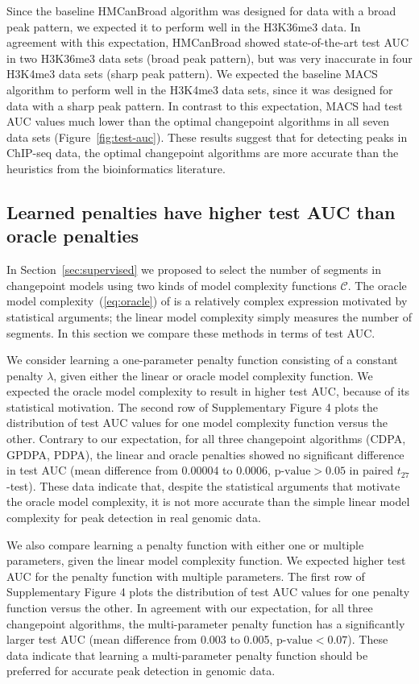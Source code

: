 \documentclass[twoside,11pt]{article}
\begin{document}
Since the baseline HMCanBroad algorithm was designed for data with a
broad peak pattern, we expected it to perform well in the H3K36me3
data. In agreement with this expectation, HMCanBroad showed
state-of-the-art test AUC in two H3K36me3 data sets (broad peak
pattern), but was very inaccurate in four H3K4me3 data sets (sharp
peak pattern). We expected the baseline MACS algorithm to perform well
in the H3K4me3 data sets, since it was designed for data with a sharp
peak pattern. In contrast to this expectation, MACS had test AUC
values much lower than the optimal changepoint algorithms in all seven data
sets (Figure~\ref{fig:test-auc}). These results suggest that for
detecting peaks in ChIP-seq data, the optimal changepoint algorithms are more
accurate than the heuristics from the bioinformatics literature.

\subsection{Learned penalties have higher test AUC than oracle
  penalties}

In Section~\ref{sec:supervised} we proposed to select the number of
segments in changepoint models using two kinds of model complexity
functions $\mathcal C$. The oracle model complexity~(\ref{eq:oracle})
of \citet{cleynen2013segmentation} is a relatively complex expression
 motivated by statistical arguments; the linear model complexity
simply measures the number of segments. In this section we compare
these methods in terms of test AUC.

We consider learning a one-parameter penalty function consisting of a
constant penalty $\lambda$, given either the linear or oracle model
complexity function. We expected the oracle model complexity to result
in higher test AUC, because of its statistical motivation. The second
row of Supplementary Figure 4 plots the distribution of test AUC
values for one model complexity function versus the other. Contrary to
our expectation, for all three changepoint algorithms (CDPA, GPDPA,
PDPA), the linear and oracle penalties showed no significant
difference in test AUC (mean difference from 0.00004 to 0.0006,
$\text{p-value}>0.05$ in paired $t_{27}$-test). These data indicate
that, despite the statistical arguments that motivate the oracle model
complexity, it is not more accurate than the simple linear model
complexity for peak detection in real genomic data.

We also compare learning a penalty function with either one or
multiple parameters, given the linear model complexity function. We
expected higher test AUC for the penalty function with multiple
parameters. The first row of Supplementary Figure 4 plots the
distribution of test AUC values for one penalty function versus the
other. In agreement with our expectation, for all three changepoint
algorithms, the multi-parameter penalty function has a significantly
larger test AUC (mean difference from 0.003 to 0.005,
$\text{p-value}<0.07$). These data indicate that learning a
multi-parameter penalty function should be preferred for accurate peak
detection in genomic data.
\end{document}
